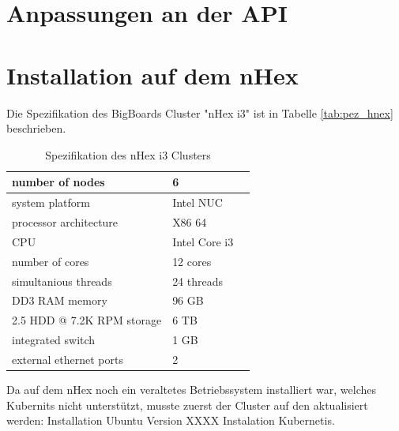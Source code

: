 \section{Anpassungen an der API}
\label{sec:anpassung_api}

\section{Installation auf dem nHex}
\label{sec:nHex}

Die Spezifikation des BigBoards Cluster "nHex i3" ist in Tabelle \ref{tab:pez_hnex} beschrieben.

\begin{table}[H]
	\centering
		\begin{tabular}{lll} 
			number of nodes & 6 \\ \midrule
			system platform  & Intel NUC \\ \midrule
			processor architecture & X86 64 \\ \midrule
			CPU & Intel Core i3 \\ \midrule
			number of cores & 12 cores \\ \midrule
			simultanious threads & 24 threads \\ \midrule
			DD3 RAM memory & 96 GB \\ \midrule
			2.5 HDD @ 7.2K RPM storage & 6 TB \\ \midrule
			integrated switch & 1 GB \\ \midrule
			external ethernet ports & 2 \\ \bottomrule
		\end{tabular}
	\caption{Spezifikation des nHex i3 Clusters}
	\label{tab:spez_hnex}
\end{table}



Da auf dem nHex noch ein veraltetes Betriebssystem installiert war, welches Kubernits nicht unterstützt, musste zuerst der Cluster auf den aktualisiert werden:
Installation Ubuntu Version XXXX
Instalation Kubernetis.




